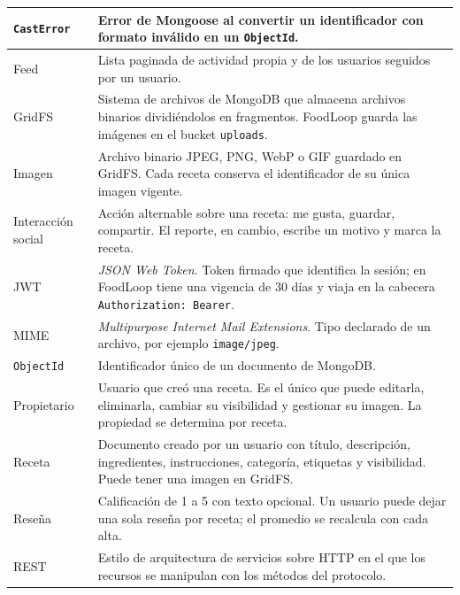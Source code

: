 \documentclass[doc,12pt,a4paper]{apa7}
\begin{document}
\begin{longtable}{|P{3.3cm}|L{11.2cm}|}
\texttt{CastError} & Error de Mongoose al convertir un identificador con formato inválido en un \texttt{ObjectId}. \\ \hline

Feed & Lista paginada de actividad propia y de los usuarios seguidos por un usuario. \\ \hline

GridFS & Sistema de archivos de MongoDB que almacena archivos binarios dividiéndolos en fragmentos. FoodLoop guarda las imágenes en el bucket \texttt{uploads}. \\ \hline

Imagen & Archivo binario JPEG, PNG, WebP o GIF guardado en GridFS. Cada receta conserva el identificador de su única imagen vigente. \\ \hline

Interacción social & Acción alternable sobre una receta: me gusta, guardar, compartir. El reporte, en cambio, escribe un motivo y marca la receta. \\ \hline

JWT & \textit{JSON Web Token}. Token firmado que identifica la sesión; en FoodLoop tiene una vigencia de 30 días y viaja en la cabecera \texttt{Authorization: Bearer}. \\ \hline

MIME & \textit{Multipurpose Internet Mail Extensions}. Tipo declarado de un archivo, por ejemplo \texttt{image/jpeg}. \\ \hline

\texttt{ObjectId} & Identificador único de un documento de MongoDB. \\ \hline

Propietario & Usuario que creó una receta. Es el único que puede editarla, eliminarla, cambiar su visibilidad y gestionar su imagen. La propiedad se determina por receta. \\ \hline

Receta & Documento creado por un usuario con título, descripción, ingredientes, instrucciones, categoría, etiquetas y visibilidad. Puede tener una imagen en GridFS. \\ \hline

Reseña & Calificación de 1 a 5 con texto opcional. Un usuario puede dejar una sola reseña por receta; el promedio se recalcula con cada alta. \\ \hline

REST & Estilo de arquitectura de servicios sobre HTTP en el que los recursos se manipulan con los métodos del protocolo. \\ \hline


\end{longtable}
\end{document}
